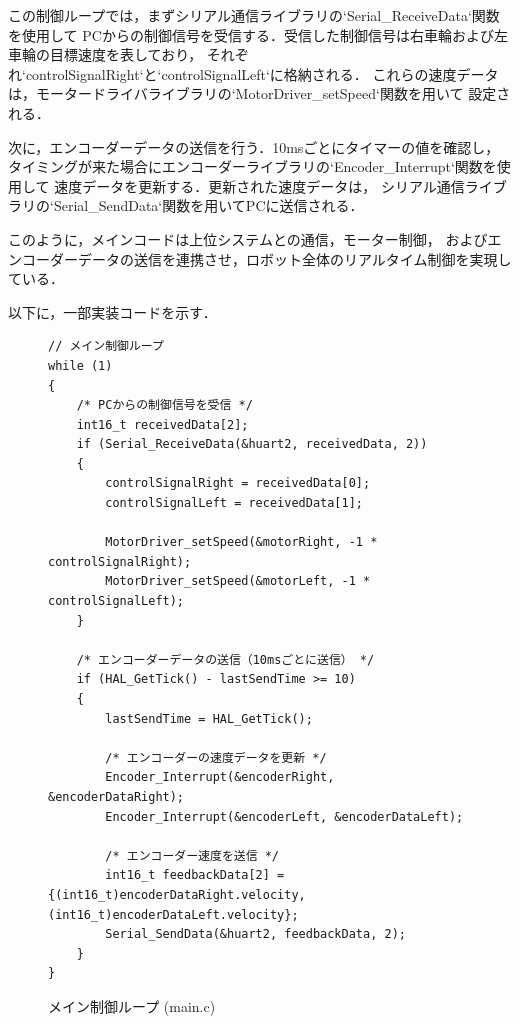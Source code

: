 この制御ループでは，まずシリアル通信ライブラリの`Serial\_ReceiveData`関数を使用して
PCからの制御信号を受信する．受信した制御信号は右車輪および左車輪の目標速度を表しており，
それぞれ`controlSignalRight`と`controlSignalLeft`に格納される．
これらの速度データは，モータードライバライブラリの`MotorDriver\_setSpeed`関数を用いて
設定される．

次に，エンコーダーデータの送信を行う．10msごとにタイマーの値を確認し，
タイミングが来た場合にエンコーダーライブラリの`Encoder\_Interrupt`関数を使用して
速度データを更新する．更新された速度データは，
シリアル通信ライブラリの`Serial\_SendData`関数を用いてPCに送信される．

このように，メインコードは上位システムとの通信，モーター制御，
およびエンコーダーデータの送信を連携させ，ロボット全体のリアルタイム制御を実現している．


以下に，一部実装コードを示す．

\lstset{language=C}
\begin{figure}[H]
    \centering
    \begin{lstlisting}
// メイン制御ループ
while (1)
{
    /* PCからの制御信号を受信 */
    int16_t receivedData[2];
    if (Serial_ReceiveData(&huart2, receivedData, 2))
    {
        controlSignalRight = receivedData[0];
        controlSignalLeft = receivedData[1];

        MotorDriver_setSpeed(&motorRight, -1 * controlSignalRight);
        MotorDriver_setSpeed(&motorLeft, -1 * controlSignalLeft);
    }

    /* エンコーダーデータの送信（10msごとに送信） */
    if (HAL_GetTick() - lastSendTime >= 10)
    {
        lastSendTime = HAL_GetTick();

        /* エンコーダーの速度データを更新 */
        Encoder_Interrupt(&encoderRight, &encoderDataRight);
        Encoder_Interrupt(&encoderLeft, &encoderDataLeft);

        /* エンコーダー速度を送信 */
        int16_t feedbackData[2] = {(int16_t)encoderDataRight.velocity, (int16_t)encoderDataLeft.velocity};
        Serial_SendData(&huart2, feedbackData, 2);
    }
}
    \end{lstlisting}
    \caption{メイン制御ループ (main.c)}
    \label{lst:main_loop}
\end{figure}
